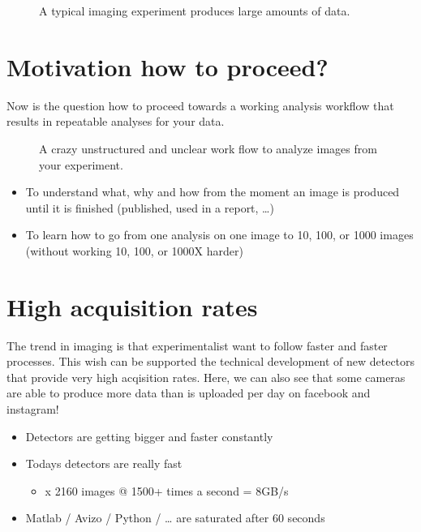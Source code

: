 \documentclass[letterpaper,10pt,english]{sphinxmanual}
\begin{document}
\begin{figure}[htbp]
\centering
\capstart

\noindent{}
\caption{A typical imaging experiment produces large amounts of data.}\label{\detokenize{01-Introduction:id7}}\end{figure}




\section{Motivation \sphinxhyphen{} how to proceed?}
\label{\detokenize{01-Introduction:motivation-how-to-proceed}}
\sphinxAtStartPar
Now is the question how to proceed towards a working analysis workflow that results in repeatable analyses for your data.

\begin{figure}[htbp]
\centering
\capstart

\noindent{}
\caption{A crazy unstructured and unclear work flow to analyze images from your experiment.}\label{\detokenize{01-Introduction:id8}}\end{figure}


\begin{itemize}
\item {} 
\sphinxAtStartPar
To understand what, why and how from the moment an image is produced until it is finished (published, used in a report, …)

\item {} 
\sphinxAtStartPar
To learn how to go from one analysis on one image to 10, 100, or 1000 images (without working 10, 100, or 1000X harder)

\end{itemize}


\section{High acquisition rates}
\label{\detokenize{01-Introduction:high-acquisition-rates}}
\sphinxAtStartPar
The trend in imaging is that experimentalist want to follow faster and faster processes. This wish can be supported the technical development of new detectors that provide very high acqisition rates. Here, we can also see that some cameras are able to produce more data than is uploaded per day on facebook and instagram!
\begin{itemize}
\item {} 
\sphinxAtStartPar
Detectors are getting bigger and faster constantly

\item {} 
\sphinxAtStartPar
Todays detectors are really fast
\begin{itemize}
\item {} 
 x 2160 images @ 1500+ times a second = 8GB/s

\end{itemize}

\item {} 
\sphinxAtStartPar
Matlab / Avizo / Python / … are saturated after 60 seconds

\end{itemize}
\end{document}
